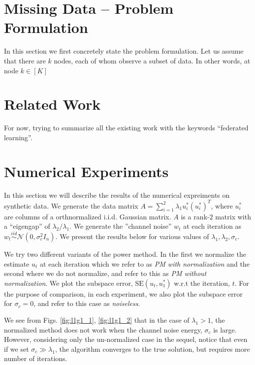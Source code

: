 \documentclass[10pt]{article}
\newcommand{\SE}{\mathrm{SE}}
\begin{document}
\section{Missing Data -- Problem Formulation}
In this section we first concretely state the problem formulation. Let us assume that there are $k$ nodes, each of whom observe a subset of data. In other words, at node $k \in [K]$


\section{Related Work}
For now, trying to summarize all the existing work with the keywords ``federated learning''.




\clearpage


\section{Numerical Experiments}
In this section we will describe the results of the numerical expreiments on synthetic data. We generate the data matrix $A = \sum_{i=1}^2 \lambda_1 u_i^* (u_i^*)^T$, where $u_i^*$ are columns of a orthnormalized i.i.d. Gaussian matrix. $A$ is a rank-$2$ matrix with a ``eigengap'' of $\lambda_2/\lambda_1$. We generate the ''channel noise'' $w_t$ at each iteration as $w_t \overset{iid}{\sim} \mathcal{N}(0, \sigma_c^2 I_n)$. We present the results below for various values of $\lambda_1, \lambda_2, \sigma_c$. 

We try two different variants of the power method. In the first we normalize the estimate $u_t$ at each iteration which we refer to as {\em PM with normalization} and the second where we do not normalize, and refer to this as {\em PM without normalization}. We plot the subspace error, $\SE(u_t, u_1^*)$ w.r.t the iteration, $t$. For the purpose of comparison, in each experiment, we also plot the subspace error for $\sigma_c = 0$, and refer to this case as {\em noiseless}. 

We see from Figs. \ref{fig:l1g1_1}, \ref{fig:l1g1_2} that in the case of $\lambda_1 > 1$, the normalized method does not work when the channel noise energy, $\sigma_c$ is large. However, considering only the un-normalized case in the sequel, notice that even if we set $\sigma_c \gg \lambda_1$, the algorithm converges to the true solution, but requires more number of iterations.
\end{document}

